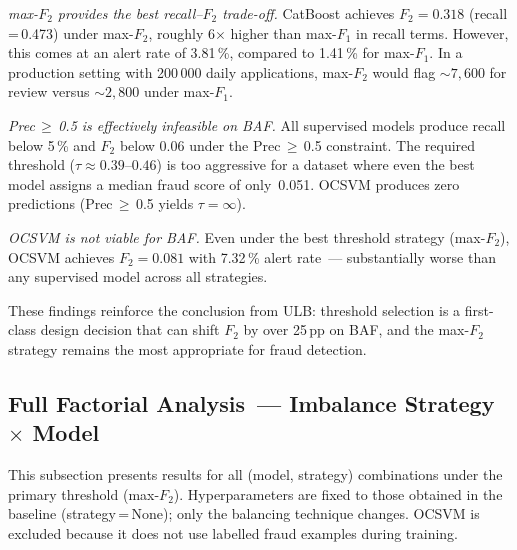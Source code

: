 \textit{max-$F_2$ provides the best recall--$F_2$ trade-off.}
CatBoost achieves $F_2=0.318$ (recall\,=\,0.473) under max-$F_2$,
roughly 6$\times$ higher than max-$F_1$ in recall terms.
However, this comes at an alert rate of 3.81\,\%, compared to 1.41\,\% for max-$F_1$.
In a production setting with 200\,000 daily applications, max-$F_2$
would flag ${\sim}7{,}600$ for review versus ${\sim}2{,}800$ under max-$F_1$.

\textit{Prec\,$\geq$\,0.5 is effectively infeasible on BAF.}
All supervised models produce recall below 5\,\% and $F_2$ below 0.06
under the Prec\,$\geq$\,0.5 constraint.
The required threshold ($\tau\approx0.39$--$0.46$) is too aggressive
for a dataset where even the best model assigns a median fraud score of only~0.051.
OCSVM produces zero predictions (Prec\,$\geq$\,0.5 yields $\tau=\infty$).

\textit{OCSVM is not viable for BAF.}
Even under the best threshold strategy (max-$F_2$), OCSVM achieves
$F_2=0.081$ with 7.32\,\% alert rate~--- substantially worse than any
supervised model across all strategies.

These findings reinforce the conclusion from ULB: threshold selection is a first-class
design decision that can shift $F_2$ by over 25\,pp on BAF, and the
max-$F_2$ strategy remains the most appropriate for fraud detection.



\subsection{Full Factorial Analysis~--- Imbalance Strategy $\times$ Model}
\label{sec:factorial_results}

This subsection presents results for all (model, strategy) combinations
under the primary threshold (max-$F_2$).
Hyperparameters are fixed to those obtained in the baseline (strategy\,=\,None);
only the balancing technique changes.
OCSVM is excluded because it does not use labelled fraud examples during training.

